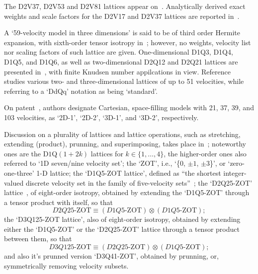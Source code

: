     The D2V37, D2V53 and D2V81 lattices appear on~\cite{2007-PhilippiPC+DosSantosLOE-IntJModPhysC}. Analytically  derived  exact
    weights and scale factors for the D2V17 and D2V37 lattices are reported in~\cite{2007-SiebertDN+PhilippiPC-IntJModPhysC}.

    A `59-velocity model in three dimensions' is said to be of third order Hermite expansion, with sixth-order  tensor  isotropy
    in~\cite{2008-ChenH+ShanX-PhysD}; however, no weights, velocity  list  nor  scaling  factors  of  such  lattice  are  given.
    One-dimensional  D1Q3,  D1Q4,  D1Q5,  and  D1Q6,  as  well  as  two-dimensional  D2Q12  and  D2Q21  lattices  are  presented
    in~\cite{2008-KimSH+BoydID-JComputPhys},      with      finite      Knudsen      number      appilcations      in      view.
    Reference~\cite{2008-RubinsteinR+LuoLS-PhysRev} studies various two- and three-dimensional lattices of up to 51  velocities,
    while referring to a `DdQq' notation as being `standard'.

    On patent~\cite{2008-ShanX+ZhangR-USPat}, authors designate Cartesian,  space-filling  models  with  21,  37,  39,  and  103
    velocities, as `2D-1', `2D-2', `3D-1', and `3D-2', respectively.

    Discussion on a plurality of lattices and lattice  operations,  such  as  stretching,  extending  (product),  prunning,  and
    superimposing, takes place in~\cite{2009-ChikatamarlaSS+KarlinIV-PhysRevE}; noteworthy ones are the  D$1$Q$(1+2k)$  lattices
    for $k \in \{1, \ldots, 4\}$, the higher-order ones also referred to `1D seven/nine velocity set'; the `ZOT', i.e.,  `\{$0$,
    $\pm 1$, $\pm 3$\}', or  `zero-one-three'  1-D  lattice;  the  `D1Q5-ZOT  lattice',  defined  as  ``{\swshape  the  shortest
    integer-valued        discrete        velocity        set        in        the        family        of         five-velocity
    sets\/}''~\cite{2006-ChikatamarlaSS+KarlinIV-PhysRevLett};                          the                          `D2Q25-ZOT'
    lattice~\cite{2008-ChikatamarlaSS+KarlinIV-CompPhysComm}, of eight-order isotropy,  obtained  by  extending  the  `D1Q5-ZOT'
    through a tensor product with itself, so that
    \begin{equation}
        D2Q25\mbox{-ZOT} \equiv (D1Q5\mbox{-ZOT}) \otimes (D1Q5\mbox{-ZOT});
    \end{equation}
    \noindent the `D3Q125-ZOT lattice', also of eight-order iso\-tro\-py, obtained by extending either  the  `D1Q5-ZOT'  or  the
    `D2Q25-ZOT' lattice through a tensor product between them, so that
    \begin{equation}
        D3Q125\mbox{-ZOT} \equiv (D2Q25\mbox{-ZOT}) \otimes (D1Q5\mbox{-ZOT});
    \end{equation}
    \noindent and also it's prunned version `D3Q41-ZOT', obtained by prunning, or, symmetrically removing velocity subsets.


